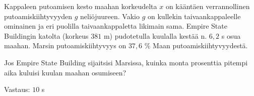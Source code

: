 \begin{tehtava}
    Kappaleen putoamisen kesto maahan korkeudelta $x$ on kääntäen verrannollinen putoamiskiihtyvyyden $g$ neliöjuureen. Vakio $g$ on kullekin taivaankappaleelle ominainen ja eri puolilla taivaankappaletta likimain sama. Empire State Buildingin katolta (korkeus $381$ m) pudotetulla kuulalla kestää n. $6,2$ s osua maahan. Marsin putoamiskiihtyvyys on $37,6$ \% Maan putoamiskiihtyvyydestä. 
    
    Jos Empire State Building sijaitsisi Marsissa, kuinka monta prosenttia pitempi aika kuluisi kuulan maahan osumiseen?
    \begin{vastaus}
        Vastaus: $10$ s
    \end{vastaus}
\end{tehtava}
